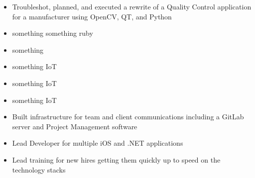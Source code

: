 \documentclass[letterpaper]{article}        %
\begin{document}



  
  \begin{itemize}
  
  \item Troubleshot, planned, and executed a rewrite of a Quality Control application for a manufacturer using OpenCV, QT, and Python
  
  \item something something ruby
  
  \item something
  
  \end{itemize}
  
  
  
  \begin{itemize}
  
  \item something IoT
  
  \item something IoT
  
  \item something IoT
  
  \end{itemize}
  
  
  
  \begin{itemize}
  
  \item Built infrastructure for team and client communications including a GitLab server and Project Management software
  
  \item Lead Developer for multiple iOS and .NET applications
  
  \item Lead training for new hires getting them quickly up to speed on the technology stacks
  
  \end{itemize}
  
  
  
\end{document}
